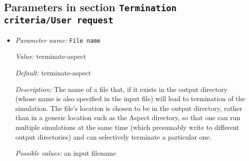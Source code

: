 \subsection{Parameters in section \tt Termination criteria/User request}
\label{parameters:Termination_20criteria/User_20request}

\begin{itemize}
\item {\it Parameter name:} {\tt File name}
\label{parameters:Termination criteria/User request/File name}


{\it Value:} terminate-aspect


{\it Default:} terminate-aspect


{\it Description:} The name of a file that, if it exists in the output directory (whose name is also specified in the input file) will lead to termination of the simulation. The file's location is chosen to be in the output directory, rather than in a generic location such as the Aspect directory, so that one can run multiple simulations at the same time (which presumably write to different output directories) and can selectively terminate a particular one.


{\it Possible values:} an input filename
\end{itemize}
